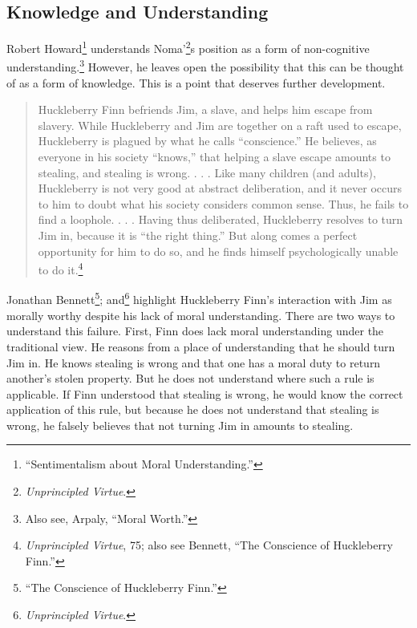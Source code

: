 \documentclass[phdthesis,12pt,final]{wuthesis}
\theoremstyle{definition}
\theoremstyle{definition}
\theoremstyle{definition}
\theoremstyle{definition}
\theoremstyle{remark}
\begin{document}
\subsection*{Knowledge and Understanding}\label{knowledge-and-understanding}

Robert Howard\footnote{{``Sentimentalism about {Moral Understanding}.''}} understands Noma'\footnote{\emph{Unprincipled {Virtue}}.}s position as a form of non-cognitive understanding.\footnote{Also see, Arpaly, {``Moral {Worth}.''}} However, he leaves open the possibility that this can be thought of as a form of knowledge. This is a point that deserves further development.

\begin{quote}
Huckleberry Finn befriends Jim, a slave, and helps him escape from slavery. While Huckleberry and Jim are together on a raft used to escape, Huckleberry is plagued by what he calls ``conscience.'' He believes, as everyone in his society ``knows,'' that helping a slave escape amounts to stealing, and stealing is wrong. . . . Like many children (and adults), Huckleberry is not very good at abstract deliberation, and it never occurs to him to doubt what his society considers common sense. Thus, he fails to find a loophole. . . . Having thus deliberated, Huckleberry resolves to turn Jim in, because it is ``the right thing.'' But along comes a perfect opportunity for him to do so, and he finds himself psychologically unable to do it.\footnote{\emph{Unprincipled {Virtue}}, 75; also see Bennett, {``The {Conscience} of {Huckleberry Finn}.''}}
\end{quote}

Jonathan Bennett\footnote{{``The {Conscience} of {Huckleberry Finn}.''}}; and\footnote{\emph{Unprincipled {Virtue}}.} highlight Huckleberry Finn's interaction with Jim as morally worthy despite his lack of moral understanding. There are two ways to understand this failure. First, Finn does lack moral understanding under the traditional view. He reasons from a place of understanding that he should turn Jim in. He knows stealing is wrong and that one has a moral duty to return another's stolen property. But he does not understand where such a rule is applicable. If Finn understood that stealing is wrong, he would know the correct application of this rule, but because he does not understand that stealing is wrong, he falsely believes that not turning Jim in amounts to stealing.
\end{document}
